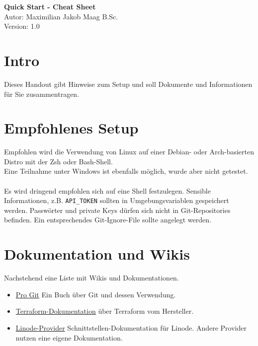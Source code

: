 \documentclass{article}
\begin{document}
    \begin{center}
        \Large \textbf{Quick Start - Cheat Sheet} \\ [6pt]
        \normalsize
        Autor: Maximilian Jakob Maag B.Sc. \\
        Version: 1.0
    \end{center}
    \section{Intro}
    Dieses Handout gibt Hinweise zum Setup und soll Dokumente und Informationen für Sie zusammentragen.
    \section{Empfohlenes Setup}
Empfohlen wird die Verwendung von Linux auf einer Debian- oder Arch-basierten Distro mit der Zsh oder Bash-Shell. \\
    Eine Teilnahme unter Windows ist ebenfalls möglich, wurde aber nicht getestet. \\\\
    Es wird dringend empfohlen sich auf eine Shell festzulegen. Sensible Informationen, z.B. \texttt{API\_TOKEN} sollten in Umgebungsvariablen gespeichert werden.
    Passwörter und private Keys dürfen sich nicht in Git-Repositories befinden. Ein entsprechendes Git‑Ignore-File sollte angelegt werden.
    \section{Dokumentation und Wikis}
    Nachstehend eine Liste mit Wikis und Dokumentationen.
    \begin{itemize}
        \item \href{https://git-scm.com/book/en/v2}{Pro Git} Ein Buch über Git und dessen Verwendung.
        \item \href{https://developer.hashicorp.com/terraform/docs}{Terraform-Dokumentation} über Terraform vom Hersteller.
        \item \href{https://registry.terraform.io/providers/linode/linode/latest/docs}{Linode-Provider} Schnittstellen-Dokumentation für Linode. Andere Provider nutzen eine eigene Dokumentation.
    \end{itemize}
\end{document}
